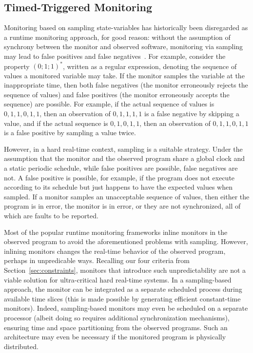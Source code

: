 \subsection{Timed-Triggered Monitoring} \label{sec:sampling}

Monitoring based on sampling state-variables has historically been disregarded as a
runtime monitoring approach, for good reason: without the assumption of
synchrony between the monitor and observed software, monitoring via
sampling may lead to false positives and false negatives~\cite{DwyerDE08}.  For
example, consider the property $(0;1;1)^*$, written as a regular expression,
denoting the sequence of values a monitored variable may take.  If the monitor
samples the variable at the inappropriate time, then both false negatives
(the monitor erroneously rejects the sequence of values) and false positives
(the monitor erroneously accepts the sequence) are possible.  For example, if
the actual sequence of values is $0,1,1,0,1,1$, then an observation of $0,1,1,1,1$ is a
false negative by skipping a value, and if the actual sequence is
$0,1,0,1,1$, then an observation of $0,1,1,0,1,1$ is a false positive by
sampling a value twice.



However, in a hard real-time context, sampling is a suitable strategy.  Under
the assumption that the monitor and the observed program share a global clock
and a static periodic schedule, while false positives are possible, false
negatives are not.  A false positive is possible, for example, if the program
does not execute according to its schedule but just happens to have the expected
values when sampled.  If a monitor samples an unacceptable sequence of values,
then either the program is in error, the monitor is in error, or they are not
synchronized, all of which are faults to be reported.

Most of the popular runtime monitoring frameworks inline monitors in
the observed program to avoid the aforementioned problems with
sampling.  However, inlining monitors changes the real-time behavior
of the observed program, perhaps in unpredicable ways. Recalling our
four criteria from Section~\ref{sec:constraints}, monitors that
introduce such unpredictability are not a viable solution for
ultra-critical hard real-time systems.  In a sampling-based approach,
the monitor can be integrated as a separate scheduled process during
available time slices (this is made possible by generating efficient
constant-time monitors).  Indeed, sampling-based monitors may even be
scheduled on a separate processor (albeit doing so requires additional
synchronization mechanisms), ensuring time and space partitioning from
the observed programs.  Such an architecture may even be necessary if
the monitored program is physically distributed. 


